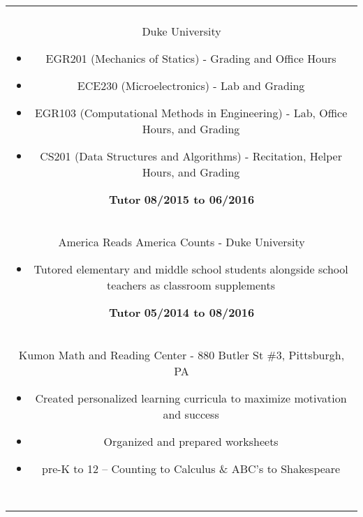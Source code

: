 \documentclass[11pt]{amsart}
\begin{document}
\begin{center}
\begin{tabular}{c}
\begin{minipage}{\textwidth}
		{\bf Teaching Assistant} \hfill {\bf 08/2016 to present}\\
		{Duke University}
		\begin{itemize}
			\item EGR201 (Mechanics of Statics) - Grading and Office Hours
			\item ECE230 (Microelectronics) - Lab and Grading
			\item EGR103 (Computational Methods in Engineering) - Lab, Office Hours, and Grading
			\item CS201 (Data Structures and Algorithms) - Recitation, Helper Hours, and Grading
		\end{itemize}
		
		{\bf Tutor} \hfill {\bf 08/2015 to 06/2016}\\
		{America Reads America Counts - Duke University}
		\begin{itemize}
			\item Tutored elementary and middle school students alongside school teachers as classroom supplements
		\end{itemize}
		
		{\bf Tutor} \hfill {\bf 05/2014 to 08/2016}\\
		{Kumon Math and Reading Center - 880 Butler St \#3, Pittsburgh, PA}
		\begin{itemize}
			\item Created personalized learning curricula to maximize motivation and success
			\item Organized and prepared worksheets
			\item pre-K to 12 -- Counting to Calculus \& ABC's to Shakespeare
		\end{itemize}
	\end{minipage}\\~\\
	

\end{tabular}
\end{center}
\end{document}
